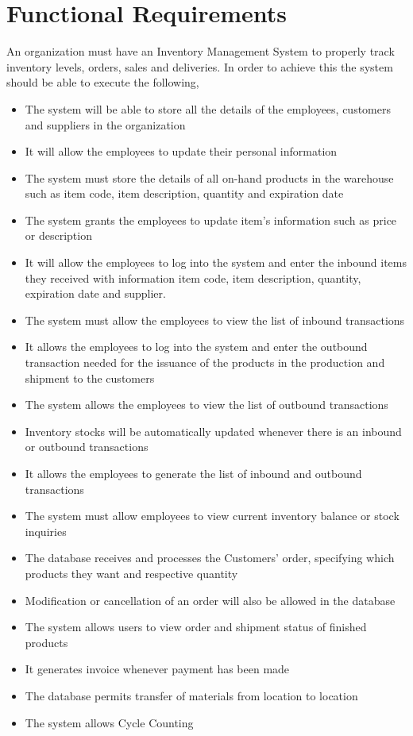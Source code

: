 \section{Functional Requirements}

An organization must have an Inventory Management System to properly track inventory levels, orders, sales and deliveries. In order to achieve this the system should be able to execute the following,

\begin{itemize}
    \item The system will be able to store all the details of the employees, customers and suppliers in the organization
    \item It will allow the employees to update their personal information
    \item The system must store the details of all on-hand products in the warehouse such as item code, item description, quantity and expiration date
    \item The system grants the employees to update item's information such as price or description
    \item It will allow the employees to log into the system and enter the inbound items they received with information item code, item description, quantity, expiration date and supplier. 
    \item The system must allow the employees to view the list of inbound transactions
    \item It allows the employees to log into the system and enter the outbound transaction needed for the issuance of the products in the production and shipment to the customers
    \item The system allows the employees to view the list of outbound transactions
    \item Inventory stocks will be automatically updated whenever there is an inbound or outbound transactions
    \item It allows the employees to generate the list of inbound and outbound transactions 
    \item The system must allow employees to view current inventory balance or stock inquiries
    \item The database receives and processes the Customers’ order, specifying which products they want and respective quantity
    \item Modification or cancellation of an order will also be allowed in the database
    \item The system allows users to view order and shipment status of finished products
    \item It generates invoice whenever payment has been made
    \item The database permits transfer of materials from location to location
    \item The system allows Cycle Counting
\end{itemize}